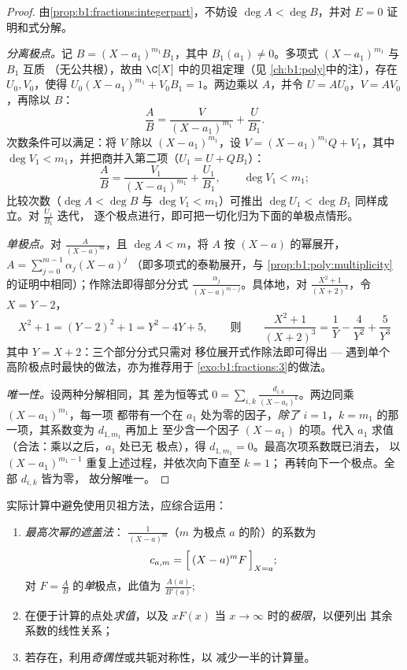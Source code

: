 \begin{proof}
由\cref{prop:b1:fractions:integerpart}，不妨设 $\deg A < \deg
B$，并对 $E = 0$ 证明和式分解。

\emph{分离极点。}记 $B = (X - a_1)^{m_1} B_1$，其中
$B_1(a_1) \neq 0$。多项式 $(X-a_1)^{m_1}$ 与 $B_1$ 互质
（无公共根），故由 $\C[X]$ 中的贝祖定理（见
\cref{ch:b1:poly}中的注），存在 $U_0, V_0$，使得 $U_0 (X-a_1)^{m_1} +
V_0 B_1 = 1$。两边乘以 $A$，并令 $U = AU_0$，$V =
AV_0$，再除以 $B$：
\[
\frac AB = \frac{V}{(X - a_1)^{m_1}} + \frac{U}{B_1} .
\]
次数条件可以满足：将 $V$ 除以
$(X-a_1)^{m_1}$，设 $V = (X-a_1)^{m_1}Q + V_1$，其中 $\deg V_1 <
m_1$，并把商并入第二项（$U_1 = U +
QB_1$）：
\[
\frac AB = \frac{V_1}{(X - a_1)^{m_1}} + \frac{U_1}{B_1},
\qquad \deg V_1 < m_1 ;
\]
比较次数（$\deg A < \deg B$ 与 $\deg V_1 < m_1$）可推出
$\deg U_1 < \deg B_1$ 同样成立。对 $\frac{U_1}{B_1}$ 迭代，
逐个极点进行，即可把一切化归为下面的单极点情形。

\emph{单极点。}对 $\frac{A}{(X-a)^m}$，且 $\deg A < m$，将 $A$
按 $(X - a)$ 的幂展开，$A = \sum_{j=0}^{m-1} \alpha_j (X - a)^j$
（即多项式的泰勒展开，与
\cref{prop:b1:poly:multiplicity}的证明中相同）；作除法即得部分分式
$\frac{\alpha_j}{(X-a)^{m-j}}$。具体地，对 $\frac{X^2 +
1}{(X+2)^3}$，令 $X = Y - 2$，
\[
X^2 + 1 = (Y - 2)^2 + 1 = Y^2 - 4Y + 5 ,
\qquad\text{则}\qquad
\frac{X^2+1}{(X+2)^3} = \frac1{Y} - \frac4{Y^2} + \frac5{Y^3}
\]
其中 $Y = X + 2$：三个部分分式只需对
移位展开式作除法即可得出 --- 遇到单个
高阶极点时最快的做法，亦为推荐用于
\cref{exo:b1:fractions:3}的做法。

\emph{唯一性。}设两种分解相同，其
差为恒等式 $0 = \sum_{i,k} \frac{d_{i,k}}{(X -
a_i)^k}$。两边同乘 $(X - a_1)^{m_1}$，每一项
都带有一个在 $a_1$ 处为零的因子，\emph{除了}
$i = 1$，$k = m_1$ 的那一项，其系数变为 $d_{1,m_1}$ 再加上
至少含一个因子 $(X - a_1)$ 的项。代入
$a_1$ 求值（合法：乘以之后，$a_1$ 处已无
极点），得 $d_{1,m_1} = 0$。最高次项系数既已消去，
以 $(X - a_1)^{m_1 - 1}$ 重复上述过程，并依次向下直至 $k = 1$；
再转向下一个极点。全部 $d_{i,k}$ 皆为零，
故分解唯一。
\end{proof}

\begin{method}[系数的计算]\label{met:b1:fractions:compute}
实际计算中避免使用贝祖方法，应综合运用：
\begin{enumerate}
  \item \emph{最高次幂的遮盖法}：
        $\frac{1}{(X-a)^m}$（$m$ 为极点 $a$ 的阶）的系数为
        \[
        c_{a,m} = \Bigl[\,(X - a)^m F\,\Bigr]_{X = a};
        \]
        对 $F = \frac AB$ 的\emph{单}极点，此值为
        $\frac{A(a)}{B'(a)}$;
  \item 在便于计算的点处\emph{求值}，以及
        $xF(x)$ 当 $x \to \infty$ 时的\emph{极限}，以便列出
        其余系数的线性关系；
  \item 若存在，利用\emph{奇偶性}或共轭对称性，以
        减少一半的计算量。
\end{enumerate}
\end{method}


